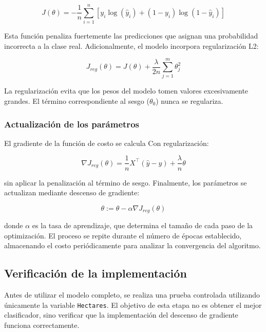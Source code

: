 \documentclass[journal]{IEEEtran}
\begin{document}
\begin{equation}
J(\theta) = -\frac{1}{n}\sum_{i=1}^{n}\left[y_i\log(\hat{y}_i) + (1-y_i)\log(1-\hat{y}_i)\right]
\label{eq:logloss}
\end{equation}

Esta función penaliza fuertemente las predicciones que asignan una probabilidad incorrecta a la clase real. Adicionalmente, el modelo incorpora regularización L2:

\begin{equation}
J_{reg}(\theta) = J(\theta) + \frac{\lambda}{2n}\sum_{j=1}^{m}\theta_j^2
\label{eq:logloss_reg}
\end{equation}

La regularización evita que los pesos del modelo tomen valores excesivamente grandes. El término correspondiente al sesgo ($\theta_0$) nunca se regulariza.

\subsubsection{Actualización de los parámetros}
El gradiente de la función de costo se calcula Con regularización:

\begin{equation}
\nabla J_{reg}(\theta) = \frac{1}{n}X^\top(\hat{y}-y) + \frac{\lambda}{n}\theta
\label{eq:grad_reg}
\end{equation}

sin aplicar la penalización al término de sesgo. Finalmente, los parámetros se actualizan mediante descenso de gradiente:

\begin{equation}
\theta := \theta - \alpha\nabla J_{reg}(\theta)
\label{eq:update}
\end{equation}

donde $\alpha$ es la tasa de aprendizaje, que determina el tamaño de cada paso de la optimización. El proceso se repite durante el número de épocas establecido, almacenando el costo periódicamente para analizar la convergencia del algoritmo.

\subsection{Verificación de la implementación}
Antes de utilizar el modelo completo, se realiza una prueba controlada utilizando únicamente la variable \texttt{Hectares}. El objetivo de esta etapa no es obtener el mejor clasificador, sino verificar que la implementación del descenso de gradiente funciona correctamente.
\end{document}
